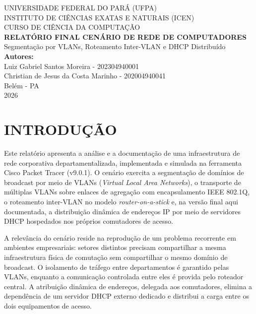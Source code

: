 \documentclass[12pt,a4paper]{article}
\begin{document}
\begin{titlepage}
\centering

{\large UNIVERSIDADE FEDERAL DO PARÁ (UFPA)}\\[0.3cm]
{\large INSTITUTO DE CIÊNCIAS EXATAS E NATURAIS (ICEN)}\\[0.3cm]
{\large CURSO DE CIÊNCIA DA COMPUTAÇÃO}\\[3.5cm]

{\LARGE\bfseries RELATÓRIO FINAL CENÁRIO DE REDE DE COMPUTADORES}\\[0.6cm]
{\large Segmentação por VLANs, Roteamento Inter-VLAN e DHCP Distribuído}\\[3.5cm]

{\large\bfseries Autores:}\\[0.3cm]
{\large Luiz Gabriel Santos Moreira - 202304940001}\\[0.2cm]
{\large Christian de Jesus da Costa Marinho - 202004940041}\\[3.5cm]

\vfill
{\large Belém - PA}\\[0.2cm]
{\large 2026}

\end{titlepage}

\tableofcontents
\newpage

\section{INTRODUÇÃO}

Este relatório apresenta a análise e a documentação de uma infraestrutura de rede
corporativa departamentalizada, implementada e simulada na ferramenta Cisco Packet
Tracer (v9.0.1). O cenário exercita a segmentação de domínios de broadcast por meio
de VLANs (\textit{Virtual Local Area Networks}), o transporte de múltiplas VLANs
sobre enlaces de agregação com encapsulamento IEEE 802.1Q, o roteamento inter-VLAN
no modelo \textit{router-on-a-stick} e, na versão final aqui documentada, a
distribuição dinâmica de endereços IP por meio de servidores DHCP hospedados nos
próprios comutadores de acesso.

A relevância do cenário reside na reprodução de um problema recorrente em ambientes
empresariais: setores distintos precisam compartilhar a mesma infraestrutura física de
comutação sem compartilhar o mesmo domínio de broadcast. O isolamento de tráfego entre
departamentos é garantido pelas VLANs, enquanto a comunicação controlada entre eles é
provida pelo roteador central. A atribuição dinâmica de endereços, delegada aos
comutadores, elimina a dependência de um servidor DHCP externo dedicado e distribui
a carga entre os dois equipamentos de acesso.
\end{document}
